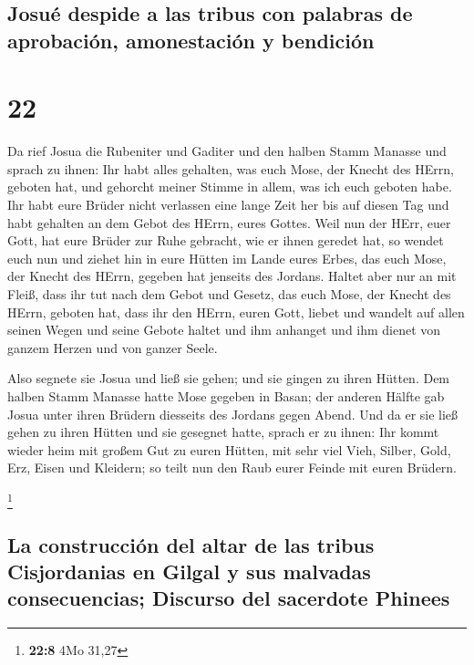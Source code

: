 \hypertarget{josuuxe9-despide-a-las-tribus-con-palabras-de-aprobaciuxf3n-amonestaciuxf3n-y-bendiciuxf3n}{%
\subsection{Josué despide a las tribus con palabras de aprobación,
amonestación y
bendición}\label{josuuxe9-despide-a-las-tribus-con-palabras-de-aprobaciuxf3n-amonestaciuxf3n-y-bendiciuxf3n}}

\hypertarget{section-21}{%
\section{22}\label{section-21}}

 Da rief Josua die Rubeniter und Gaditer und den halben
Stamm Manasse  und sprach zu ihnen: Ihr habt alles
gehalten, was euch Mose, der Knecht des HErrn, geboten hat, und gehorcht
meiner Stimme in allem, was ich euch geboten habe.  Ihr
habt eure Brüder nicht verlassen eine lange Zeit her bis auf diesen Tag
und habt gehalten an dem Gebot des HErrn, eures Gottes. 
Weil nun der HErr, euer Gott, hat eure Brüder zur Ruhe gebracht, wie er
ihnen geredet hat, so wendet euch nun und ziehet hin in eure Hütten im
Lande eures Erbes, das euch Mose, der Knecht des HErrn, gegeben hat
jenseits des Jordans.  Haltet aber nur an mit Fleiß, dass
ihr tut nach dem Gebot und Gesetz, das euch Mose, der Knecht des HErrn,
geboten hat, dass ihr den HErrn, euren Gott, liebet und wandelt auf
allen seinen Wegen und seine Gebote haltet und ihm anhanget und ihm
dienet von ganzem Herzen und von ganzer Seele.

 Also segnete sie Josua und ließ sie gehen; und sie gingen
zu ihren Hütten.  Dem halben Stamm Manasse hatte Mose
gegeben in Basan; der anderen Hälfte gab Josua unter ihren Brüdern
diesseits des Jordans gegen Abend. Und da er sie ließ gehen zu ihren
Hütten und sie gesegnet hatte,  sprach er zu ihnen: Ihr
kommt wieder heim mit großem Gut zu euren Hütten, mit sehr viel Vieh,
Silber, Gold, Erz, Eisen und Kleidern; so teilt nun den Raub eurer
Feinde mit euren Brüdern.

\footnote{\textbf{22:8} 4Mo 31,27}

\hypertarget{la-construcciuxf3n-del-altar-de-las-tribus-cisjordanias-en-gilgal-y-sus-malvadas-consecuencias-discurso-del-sacerdote-phinees}{%
\subsection{La construcción del altar de las tribus Cisjordanias en
Gilgal y sus malvadas consecuencias; Discurso del sacerdote
Phinees}\label{la-construcciuxf3n-del-altar-de-las-tribus-cisjordanias-en-gilgal-y-sus-malvadas-consecuencias-discurso-del-sacerdote-phinees}}

